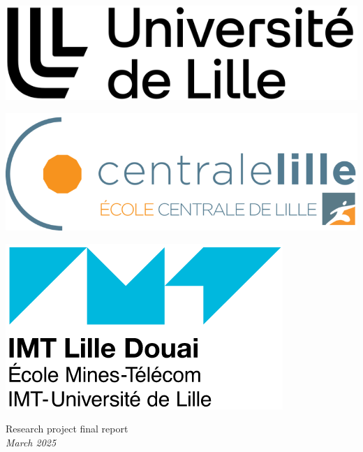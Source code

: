 \begin{titlepage}
\centering
\begin{minipage}{.25\linewidth}
\includegraphics[width=\linewidth]{../images-figures/ulille.png}
\end{minipage}
\hfill
\begin{minipage}{.25\linewidth}
\centering
\includegraphics[width=\linewidth]{../images-figures/Centrale-Lille-Ecole.png}
\end{minipage}
\hfill
\begin{minipage}{.25\linewidth}
\includegraphics[width=\linewidth]{../images-figures/imt.png}
\end{minipage}

\vfill


{\large Research project final report \\ \textit{March 2025} \vspace{1\baselineskip}}


\end{titlepage}
